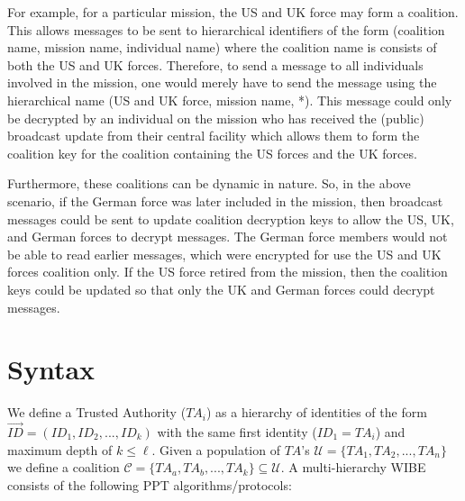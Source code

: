 \documentclass[10pt]{llncs}
\newcommand{\C}{\mathcal{C}}
\newcommand{\U}{\mathcal{U}}
\newcommand{\ID}{\mathit{ID}}
\newcommand{\TA}{\mathit{TA}}
\begin{document}
For example, for a particular mission, the US and UK force may form a coalition. This allows messages to be sent to hierarchical identifiers of the form (coalition name, mission name, individual name) where the coalition name is consists of both the US and UK forces. Therefore, to send a message to all individuals involved in the mission, one would merely have to send the message using the hierarchical name (US and UK force, mission name, *). This message could only be decrypted by an individual on the mission who has received the (public) broadcast update from their central facility which allows them to form the coalition key for the coalition containing the US forces and the UK forces.

Furthermore, these coalitions can be dynamic in nature. So, in the above scenario, if the German force was later included in the mission, then broadcast messages could be sent to update coalition decryption keys to allow the US, UK, and German forces to decrypt messages. The German force members would not be able to read earlier messages, which were encrypted for use the US and UK forces coalition only. If the US force retired from the mission, then the coalition keys could be updated so that only the UK and German forces could decrypt messages.
	
\section{Syntax}

We define a Trusted Authority ($\TA_i$) as a hierarchy of identities of the form $\vec{\ID} = (\ID_1, \ID_2, ..., \ID_k)$ with the same first identity ($\ID_1 = \TA_i$) and maximum depth of $k \le \ell$. Given a population of $\TA$'s $\U = \{\TA_1, \TA_2, ..., \TA_n\}$ we define a coalition $\C = \{\TA_a, \TA_b, ..., \TA_k\} \subseteq \U$. A multi-hierarchy WIBE consists of the following PPT algorithms/protocols:
\end{document}
